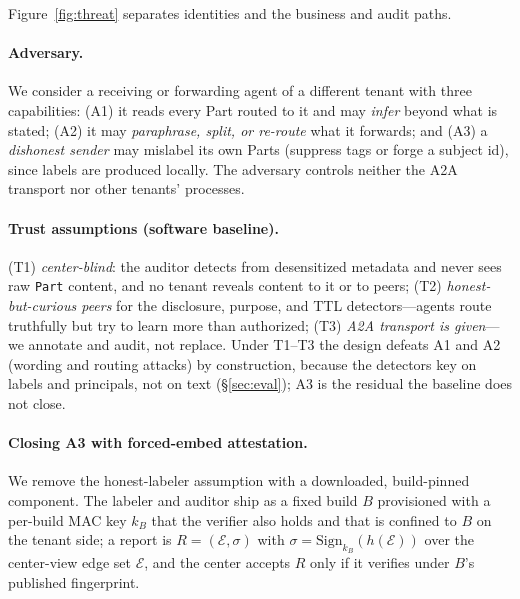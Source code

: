\documentclass[conference,compsoc]{IEEEtran}
\begin{document}
Figure~\ref{fig:threat} separates identities and the business and audit paths.


\paragraph{Adversary.} We consider a receiving or forwarding agent of a different
tenant with three capabilities: (A1) it reads every Part routed to it and may
\emph{infer} beyond what is stated; (A2) it may \emph{paraphrase, split, or re-route}
what it forwards; and (A3) a \emph{dishonest sender} may mislabel its own Parts
(suppress tags or forge a subject id), since labels are produced locally. The
adversary controls neither the A2A transport nor other tenants' processes.

\paragraph{Trust assumptions (software baseline).} (T1) \emph{center-blind}: the
auditor detects from desensitized metadata and never sees raw \texttt{Part} content,
and no tenant reveals content to it or to peers; (T2) \emph{honest-but-curious peers}
for the disclosure, purpose, and TTL detectors---agents route truthfully but try to
learn more than authorized; (T3) \emph{A2A transport is given}---we annotate and
audit, not replace. Under T1--T3 the design defeats A1 and A2 (wording and routing
attacks) by construction, because the detectors key on labels and principals, not on
text (\S\ref{sec:eval}); A3 is the residual the baseline does not close.

\paragraph{Closing A3 with forced-embed attestation.} We remove the honest-labeler
assumption with a downloaded, build-pinned component. The labeler and auditor ship as a fixed build $B$ provisioned with a per-build MAC key $k_B$ that the verifier also holds and that is confined to $B$ on the tenant side; a report is
$R=(\mathcal{E},\sigma)$ with $\sigma=\mathrm{Sign}_{k_B}(h(\mathcal{E}))$ over the
center-view edge set $\mathcal{E}$, and the center accepts $R$ only if it verifies
under $B$'s published fingerprint.
\end{document}
